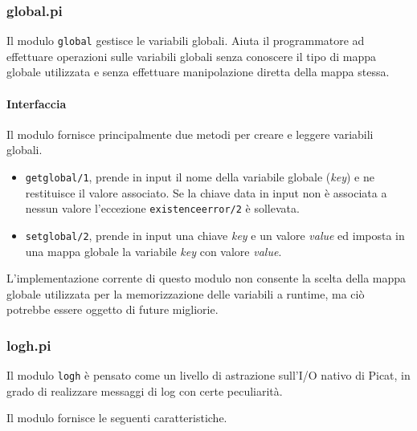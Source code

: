 \documentclass[12pt,a4paper,openright]{book} %
\begin{document}
\subsubsection{global.pi}

Il modulo \texttt{global} gestisce le variabili globali. Aiuta il
programmatore ad effettuare operazioni sulle variabili globali senza
conoscere il tipo di mappa globale utilizzata e senza effettuare
manipolazione diretta della mappa stessa.

\paragraph{Interfaccia}
Il modulo fornisce principalmente due metodi per creare e leggere
variabili globali.

\begin{itemize}
	\item \texttt{get\textunderscore global/1}, prende in input il
          nome della variabile globale (\emph{key}) e ne restituisce
          il valore associato. Se la chiave data in input non è
          associata a nessun valore l'eccezione
          \texttt{existence\textunderscore error/2} è sollevata.
	\item \texttt{set\textunderscore global/2}, prende in input
          una chiave \emph{key} e un valore \emph{value} ed imposta in
          una mappa globale la variabile \emph{key} con valore
          \emph{value}.
\end{itemize}

L'implementazione corrente di questo modulo non consente la scelta
della mappa globale utilizzata per la memorizzazione delle variabili a
runtime, ma ciò potrebbe essere oggetto di future migliorie.

\subsubsection{log\textunderscore h.pi}

Il modulo \texttt{log\textunderscore h} è pensato come un livello di
astrazione sull'I/O nativo di Picat, in grado di realizzare messaggi
di log con certe peculiarità.

Il modulo fornisce le seguenti caratteristiche.
\end{document}
